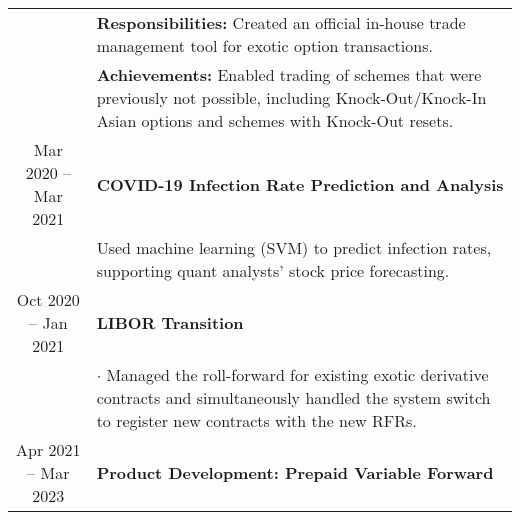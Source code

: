 \documentclass[uplatex,a4j,10.5pt,dvipdfmx]{jsarticle}
\begin{document}
\begin{longtable}{|c|p{14cm}|}
	                                      & {\small \textbf{Responsibilities:}} Created an official in-house trade management tool for exotic option transactions.                                                                                                                                                                                                                       \\
	                                      & {\small \textbf{Achievements:}} Enabled trading of schemes that were previously not possible, including Knock-Out/Knock-In Asian options and schemes with Knock-Out resets.                                                                                                                                                                  \\
	\hline
	Mar 2020 -- Mar 2021                  & \textbf{\textbullet{} COVID-19 Infection Rate Prediction and Analysis}                                                                                                                                                                                                                                                                       \\
	                                      & Used machine learning (SVM) to predict infection rates, supporting quant analysts' stock price forecasting.                                                                                                                                                                                                                                  \\
	\hline
	Oct 2020 -- Jan 2021                  & \textbf{\textbullet{} LIBOR Transition}                                                                                                                                                                                                                                                                                                      \\
	                                      & $\cdot$ Managed the roll-forward for existing exotic derivative contracts and simultaneously handled the system switch to register new contracts with the new RFRs.                                                                                                                                                                          \\
	\hline
	Apr 2021 -- Mar 2023                  & \textbf{\textbullet{} Product Development: Prepaid Variable Forward}                                                                                                                                                                                                                                                                         \\

\end{longtable}
\end{document}
